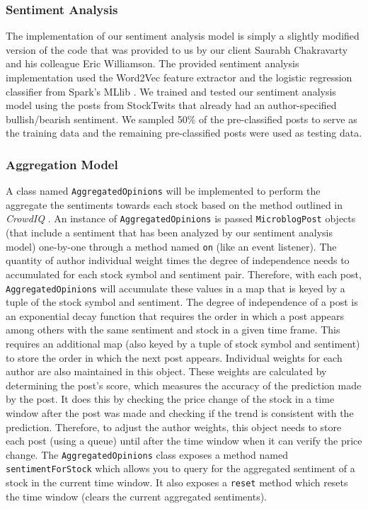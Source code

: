 \subsubsection{Sentiment Analysis}

The implementation of our sentiment analysis model is simply a slightly modified version of the code that was provided to us by our client Saurabh Chakravarty and his colleague Eric Williamson. The provided sentiment analysis implementation used the Word2Vec feature extractor and the logistic regression classifier from Spark's MLlib \cite{sparkml}. We trained and tested our sentiment analysis model using the posts from StockTwits that already had an author-specified bullish/bearish sentiment. We sampled 50\% of the pre-classified posts to serve as the training data and the remaining pre-classified posts were used as testing data.

\subsubsection{Aggregation Model}

A class named \texttt{AggregatedOpinions} will be implemented to perform the aggregate the sentiments towards each stock based on the method outlined in \textit{CrowdIQ} \cite{crowdiq}. An instance of \texttt{AggregatedOpinions} is passed \texttt{MicroblogPost} objects (that include a sentiment that has been analyzed by our sentiment analysis model) one-by-one through a method named \texttt{on} (like an event listener). The quantity of author individual weight times the degree of independence needs to accumulated for each stock symbol and sentiment pair. Therefore, with each post, \texttt{AggregatedOpinions} will accumulate these values in a map that is keyed by a tuple of the stock symbol and sentiment. The degree of independence of a post is an exponential decay function that requires the order in which a post appears among others with the same sentiment and stock in a given time frame. This requires an additional map (also keyed by a tuple of stock symbol and sentiment) to store the order in which the next post appears. Individual weights for each author are also maintained in this object. These weights are calculated by determining the post's score, which measures the accuracy of the prediction made by the post. It does this by checking the price change of the stock in a time window after the post was made and checking if the trend is consistent with the prediction. Therefore, to adjust the author weights, this object needs to store each post (using a queue) until after the time window when it can verify the price change. The \texttt{AggregatedOpinions} class exposes a method named \texttt{sentimentForStock} which allows you to query for the aggregated sentiment of a stock in the current time window. It also exposes a \texttt{reset} method which resets the time window (clears the current aggregated sentiments).

